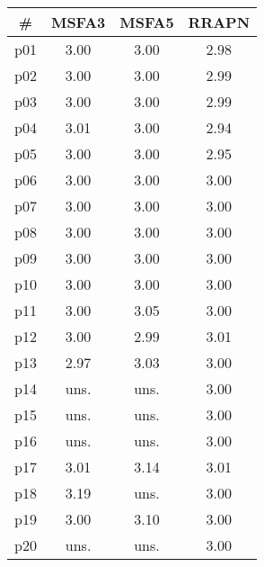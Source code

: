 \begin{tabular}{cccc}
\toprule
\textbf{\#} & \textbf{MSFA3} & \textbf{MSFA5} & \textbf{RRAPN}\\
\midrule
p01 & 3.00 & 3.00 & 2.98\\
p02 & 3.00 & 3.00 & 2.99\\
p03 & 3.00 & 3.00 & 2.99\\
p04 & 3.01 & 3.00 & 2.94\\
p05 & 3.00 & 3.00 & 2.95\\
p06 & 3.00 & 3.00 & 3.00\\
p07 & 3.00 & 3.00 & 3.00\\
p08 & 3.00 & 3.00 & 3.00\\
p09 & 3.00 & 3.00 & 3.00\\
p10 & 3.00 & 3.00 & 3.00\\
p11 & 3.00 & 3.05 & 3.00\\
p12 & 3.00 & 2.99 & 3.01\\
p13 & 2.97 & 3.03 & 3.00\\
p14 & uns. & uns. & 3.00\\
p15 & uns. & uns. & 3.00\\
p16 & uns. & uns. & 3.00\\
p17 & 3.01 & 3.14 & 3.01\\
p18 & 3.19 & uns. & 3.00\\
p19 & 3.00 & 3.10 & 3.00\\
p20 & uns. & uns. & 3.00\\
\bottomrule
\end{tabular}

